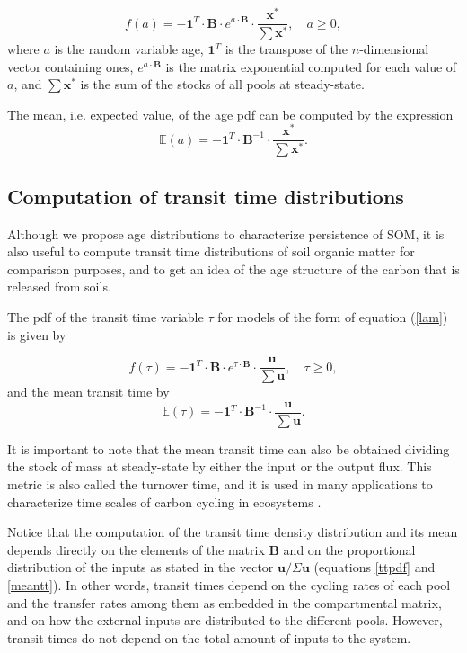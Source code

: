 \documentclass[draft,linenumbers]{agujournal}
\begin{document}
\begin{equation} \label{agepdf}
f(a) = - \mathbf{1}^{T} \cdot \mathbf{B} \cdot e^{a \cdot \mathbf{B}} \cdot \frac{{\bm x}^{\ast}}{\sum {\bm x}^{\ast}}, \quad a \geq 0,
\end{equation}
where $a$ is the random variable age, $\mathbf{1}^{T}$ is the transpose of the $n$-dimensional vector containing ones, $e^{a \cdot \mathbf{B}}$ is the matrix exponential computed for each value of $a$, and $\sum{\bm x}^{\ast}$ is the sum of the stocks of all pools at steady-state. 

The mean, i.e. expected value, of the age pdf can be computed by the expression
\begin{equation} \label{meanage}
\mathbb{E}(a) = - \mathbf{1}^{T} \cdot \mathbf{B}^{-1} \cdot \frac{{\bm x}^{\ast}}{\sum {\bm x}^{\ast}}.
\end{equation}

\subsection{Computation of transit time distributions}
Although we propose age distributions to characterize persistence of SOM, it is also useful to compute transit time distributions of soil organic matter for comparison purposes, and to get an idea of the age structure of the carbon that is released from soils. 

The pdf of the transit time variable $\tau$ for models of the form of equation (\ref{lam}) is given by \citep{Metzler2018MG}

\begin{equation} \label{ttpdf}
f(\tau) = - \mathbf{1}^{T} \cdot \mathbf{B} \cdot e^{\tau \cdot \mathbf{B}} \cdot \frac{{\bm u}}{\sum {\bm u}}, \quad \tau \geq 0,
\end{equation}
and the mean transit time by
\begin{equation} \label{meantt}
\mathbb{E}(\tau) = - \mathbf{1}^{T} \cdot \mathbf{B}^{-1} \cdot \frac{{\bm u}}{\sum {\bm u}}.
\end{equation}

It is important to note that the mean transit time can also be obtained dividing the stock of mass at steady-state by either the input or the output flux. This metric is also called the turnover time, and it is used in many applications to characterize time scales of carbon cycling in ecosystems \citep{Sierra2017}. 

Notice that the computation of the transit time density distribution and its mean depends directly on the elements of the matrix $\mathbf{B}$ and on the proportional distribution of the inputs as stated in the vector $\bm{u}/ \Sigma \bm{u}$ (equations \ref{ttpdf} and \ref{meantt}). In other words, transit times depend on the cycling rates of each pool and the transfer rates among them as embedded in the compartmental matrix, and on how the external inputs are distributed to the different pools. However, transit times do not depend on the total amount of inputs to the system. 
\end{document}
